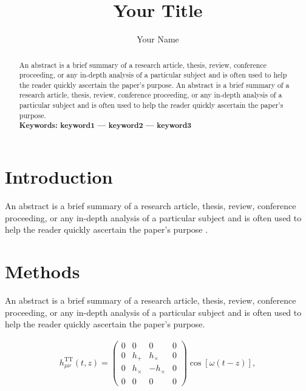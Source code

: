 \documentclass[a4paper,zihao=-4,fontset=ubuntu]{ctexart}
\author{Your Name}
\title{\bfseries Your Title}
\date{}
\begin{document}
    
    \setcounter{page}{1}
    \maketitle
    \thispagestyle{fancy}
    
    \begin{abstract}
        An abstract is a brief summary of a research article, thesis, review, conference proceeding, or any in-depth analysis of a particular subject and is often used to help the reader quickly ascertain the paper's purpose. An abstract is a brief summary of a research article, thesis, review, conference proceeding, or any in-depth analysis of a particular subject and is often used to help the reader quickly ascertain the paper's purpose. \\
        \textbf{Keywords: keyword1 --- keyword2 --- keyword3}
    \end{abstract}

    \section{Introduction}
    
    An abstract is a brief summary of a research article, thesis, review, conference proceeding, or any in-depth analysis of a particular subject and is often used to help the reader quickly ascertain the paper's purpose \cite{2022NewAR..9501659P}.

    \section{Methods}

    An abstract is a brief summary of a research article, thesis, review, conference proceeding, or any in-depth analysis of a particular subject and is often used to help the reader quickly ascertain the paper's purpose.

    \begin{align}
        h^\mathrm{TT}_{\mu\nu}(t,z) = 
        \begin{pmatrix}
          0 & 0 & 0 & 0 \\
          0 & h_+ & h_\times & 0 \\
          0 & h_\times & -h_+ & 0 \\
          0 & 0 & 0 & 0 
        \end{pmatrix}
        \cos\left[\omega(t-z)\right],
        \label{eqn:h}
    \end{align}
\end{document}
